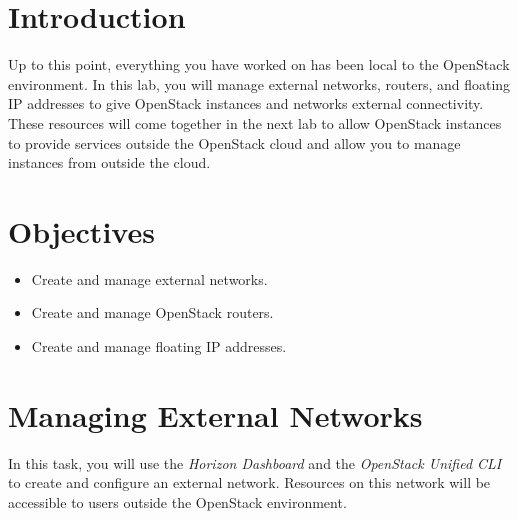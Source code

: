 \documentclass[letterpaper, 12pt]{article}
\begin{document}

\section*{Introduction}\label{sec:introduction}
Up to this point, everything you have worked on has been local to the OpenStack environment.
In this lab, you will manage external networks, routers, and floating IP addresses to give OpenStack instances and networks external connectivity.
These resources will come together in the next lab to allow OpenStack instances to provide services outside the OpenStack cloud and allow you to manage instances from outside the cloud.

\section*{Objectives}\label{sec:objectives}
\begin{itemize}[itemsep=0pt]
    \item Create and manage external networks.
    \item Create and manage OpenStack routers.
    \item Create and manage floating IP addresses.
\end{itemize}
\clearpage

\labsettings

\section{Managing External Networks}\label{sec:managing-external-networks}
In this task, you will use the \textit{Horizon Dashboard} and the \textit{OpenStack Unified CLI} to create and configure an external network.
Resources on this network will be accessible to users outside the OpenStack environment.
\end{document}
